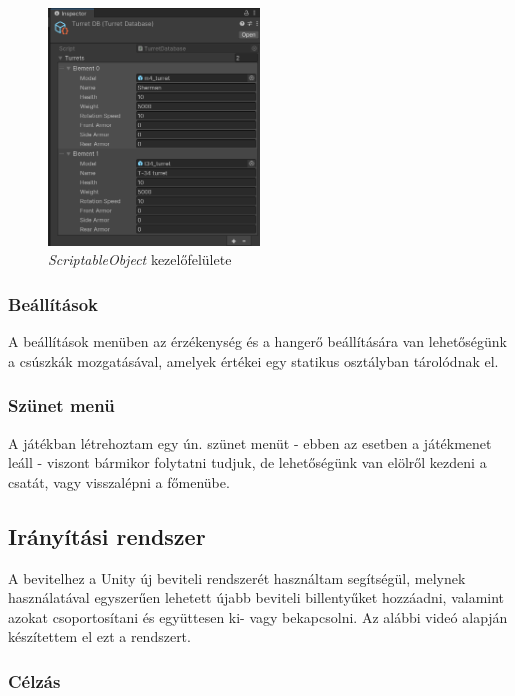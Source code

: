 \documentclass[
]{thesis-ekf}
\theoremstyle{definition}
\theoremstyle{remark}
\begin{document}
\begin{figure}[H]
    \centering
    \includegraphics[width=0.5\textwidth]{screenshots/scriptableobject.png}
    \caption{\emph{ScriptableObject} kezelőfelülete}
    \label{fig:scriptableobject}
\end{figure}


\subsubsection{Beállítások}

A beállítások menüben az érzékenység és a hangerő beállítására van lehetőségünk a csúszkák mozgatásával, amelyek értékei egy statikus osztályban tárolódnak el.


\subsubsection{Szünet menü}

A játékban létrehoztam egy ún. szünet menüt - ebben az esetben a játékmenet leáll - viszont bármikor folytatni tudjuk, de lehetőségünk van elölről kezdeni a csatát, vagy visszalépni a főmenübe.

\subsection{Irányítási rendszer}

A bevitelhez a Unity új beviteli rendszerét használtam segítségül, melynek használatával egyszerűen lehetett újabb beviteli billentyűket hozzáadni, valamint azokat csoportosítani és együttesen ki- vagy bekapcsolni. Az alábbi videó\cite{inputsystem} alapján készítettem el ezt a rendszert.

\subsubsection{Célzás}
\end{document}
